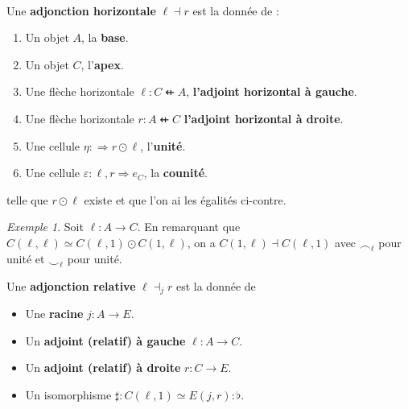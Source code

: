 \documentclass[8pt,a4paper,french,draft]{article}
\newcommand{\To}{\Rightarrow}
\newcommand{\dfrom}{\nvleftarrow}
\theoremstyle{plain}
\theoremstyle{definition}
\theoremstyle{remark}
\newtheorem{example}[theorem]{Exemple}
\begin{document}
\begin{definition}
\begin{figure}
\[\begin{tikzcd}
        \end{tikzcd}\]
    \end{figure}
    Une \textbf{adjonction horizontale} $\ell\dashv r$ est la donnée de :
    \begin{enumerate}
        \item Un objet $A$, la \textbf{base}.
        \item Un objet $C$, l'\textbf{apex}.
        \item Une flèche horizontale $\ell : C \dfrom A$, \textbf{l'adjoint horizontal à gauche}.
        \item Une flèche horizontale $r : A \dfrom C$ \textbf{l'adjoint horizontal à droite}.
        \item Une cellule $\eta : \To r\odot\ell$, l'\textbf{unité}.
        \item Une cellule $\varepsilon : \ell, r \To e_C$, la \textbf{counité}.
    \end{enumerate}
    telle que $r\odot\ell$ existe et que l'on ai les égalités ci-contre.
\end{definition}

\begin{example}
    Soit $\ell : A \to C$. En remarquant que $C(\ell, \ell) \simeq C(\ell, 1) \odot C(1, \ell)$, on a $C(1, \ell) \dashv C(\ell, 1)$ avec $\smallfrown_\ell$ pour unité et $\smallsmile_\ell$ pour unité.
\end{example}


\begin{definition}
    \begin{figure}
        \centering
    \end{figure}
    Une \textbf{adjonction relative} $\ell \dashv_j r$ est la donnée de
    \begin{itemize}
        \item Une \textbf{racine} $j : A \to E$.
        \item Un \textbf{adjoint (relatif) à gauche} $\ell : A \to C$.
        \item Un \textbf{adjoint (relatif) à droite} $r : C \to E$.
        \item Un isomorphisme $\sharp : C(\ell, 1) \simeq E(j, r) : \flat$. %
    \end{itemize}
\end{definition}
\end{document}
